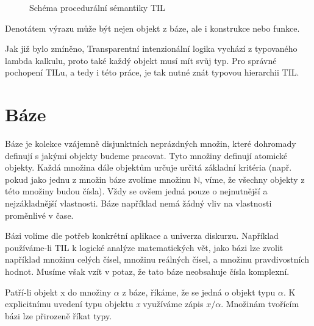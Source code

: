 \begin{figure}
    \centering
    \caption{Schéma procedurální sémantiky TIL}
    \label{fig:til-semantics}
\end{figure}

Denotátem výrazu může být nejen objekt z báze, ale i konstrukce nebo funkce.

Jak již bylo zmíněno, Transparentní intenzionální logika vychází z typovaného lambda kalkulu, proto
také každý objekt musí mít svůj typ. Pro správné pochopení TILu, a tedy i této práce, je tak nutné 
znát typovou hierarchii TIL.

\section{Báze}

Báze je kolekce vzájemně disjunktních neprázdných množin, které dohromady definují s jakými objekty
budeme pracovat. Tyto množiny definují atomické objekty. Každá množina dále objektům určuje určitá
základní kritéria (např. pokud jako jednu z množin báze zvolíme množinu $\mathbb{N}$, víme, že
všechny objekty z této množiny budou čísla). Vždy se ovšem jedná pouze o nejnutnější
a nejzákladnější vlastnosti. Báze například nemá žádný vliv na vlastnosti proměnlivé v čase.

Bázi volíme dle potřeb konkrétní aplikace a univerza diskurzu. Například používáme-li TIL k logické
analýze matematických vět, jako bázi lze zvolit například množinu celých čísel, množinu reálných
čísel, a množinu pravdivostních hodnot. Musíme však vzít v potaz, že tato báze neobsahuje čísla
komplexní.

Patří-li objekt x do množiny $\alpha$ z báze, říkáme, že se jedná o objekt typu $\alpha$.
K explicitnímu uvedení typu objektu \textit{x} využíváme zápis $x/\alpha$. Množinám tvořícím bázi
lze přirozeně říkat typy.

